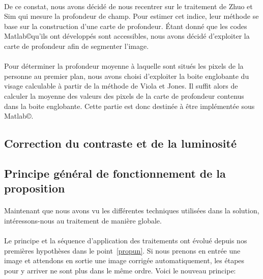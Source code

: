 \documentclass[11pt, french]{report-rd-info}
\begin{document}
\paragraph*{}
De ce constat, nous avons décidé de nous recentrer sur le traitement de Zhuo et Sim \cite{Zhuo2011} qui mesure la profondeur de champ. Pour estimer cet indice, leur méthode se base sur la construction d'une carte de profondeur. Étant donné que les codes Matlab\copyright qu'ils ont développés sont accessibles, nous avons décidé d'exploiter la carte de profondeur afin de segmenter l'image.

\paragraph*{}
Pour déterminer la profondeur moyenne à laquelle sont situés les pixels de la personne au premier plan, nous avons choisi d'exploiter la boite englobante du visage calculable à partir de la méthode de Viola et Jones. Il suffit alors de calculer la moyenne des valeurs des pixels de la carte de profondeur contenus dans la boite englobante. Cette partie est donc destinée à être implémentée sous Matlab\copyright.

\subsection{Correction du contraste et de la luminosité}

\subsection{Principe général de fonctionnement de la proposition}
\paragraph*{}
Maintenant que nous avons vu les différentes techniques utilisées dans la solution, intéressons-nous au traitement de manière globale.
\paragraph*{}
Le principe et la séquence d'application des traitements ont évolué depuis nos premières hypothèses dans le point~\ref{propun}. Si nous prenons en entrée une image et attendons en sortie une image corrigée automatiquement, les étapes pour y arriver ne sont plus dans le même ordre. Voici le nouveau principe:
\end{document}
